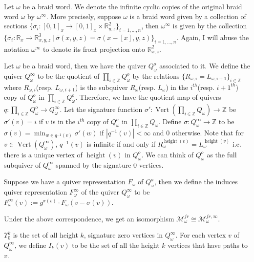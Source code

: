 \begin{definition}
	Let $\omega$ be a braid word. We denote the infinite cyclic copies of the original braid word $\omega$ by $\omega^\infty$. More precisely, suppose $\omega$ is a braid word given by a collection of sections $\{\sigma_i : [0,1]_x\rightarrow [0,1]_x\times \mathbb{R}^2_{y,z}\}_{i =1,\dots,n}$, then $\omega^\infty$ is given by the collection $\{\overline{\sigma_i} : \mathbb{R}_x\rightarrow \mathbb{R}^3_{x,y,z} ~|~ \overline{\sigma}(x,y,z) = \sigma(x-[x],y,z)\}_{i =1,\dots,n}$. Again, I will abuse the notation $\omega^\infty$ to denote its front projection onto $\mathbb{R}^2_{x,z}$. 
\end{definition}	
	
	
	
\begin{definition}	
	Let $\omega$ be a braid word, then we have the quiver $Q^o_\omega$ associated to it. We define the quiver $Q_\omega^\infty$ to be the quotient of  $\prod_{i \in \mathbb{Z}} Q^o_\omega$ by the relations $\{R_{\omega,i} = L_{\omega,i+1}\}_{i\in \mathbb{Z}}$ where $R_{\omega,i}$(resp. $L_{\omega,i+1}$) is the subquiver $R_{\omega}$(resp. $L_{\omega}$) in the $i^{th}$(resp. $i+1^{th}$) copy of $Q^o_\omega$ in $\prod_{i \in \mathbb{Z}} Q^o_\omega$. Therefore, we have the quotient map of quivers $q : \prod_{i \in \mathbb{Z}} Q^o_\omega \rightarrow Q_\omega^\infty$. Let the signature function $\sigma' : \operatorname{Vert}(\prod_{i \in \mathbb{Z}} Q_\omega) \rightarrow \mathbb{Z}$ be $\sigma'(v) = i$ if $v$ is in the $i^{th}$ copy of $Q^o_\omega$ in $\prod_{i \in \mathbb{Z}} Q_\omega$. Define $\sigma : Q_\omega^\infty \rightarrow \mathbb{Z}$ to be $\sigma(v) = \operatorname{min}_{w\in q^{-1}(v)} \sigma'(w)$ if $|q^{-1}(v)| < \infty$ and $0$ otherwise. Note that for $v\in \operatorname{Vert}(Q_\omega^\infty)$, $q^{-1}(v)$ is infinite if and only if $R_\omega^{\operatorname{height}(v)} = L_\omega^{\operatorname{height}(v)}$ i.e. there is a unique vertex of $\operatorname{height}(v)$ in $Q^o_\omega$. We can think of $Q^o_\omega$ as the full subquiver of $Q_\omega^\infty$ spanned by the signature $0$ vertices. 
\end{definition}

\begin{definition}	
Suppose we have a quiver representation $F_\omega$ of $Q^o_\omega$, then we define the induces quiver representation $F^{\infty}_{\omega}$ of the quiver $Q^{\infty}_{\omega}$ to be $F_\omega^\infty(v) := g^{\sigma(v)}\cdot F_\omega(v - \sigma(v))$. 
\end{definition}	
Under the above correspondence, we get an isomorphism $\mathcal{M}^{fr}_\omega \cong \mathcal{M}^{fr,\infty}_\omega$.
\begin{definition}
$\Upsilon^k_0$ is the set of all height $k$, signature zero vertices in $Q^{\infty}_{\omega}$. For each vertex $v$ of $Q^{\infty}_{\omega}$, we define $I_k(v)$ to be the set of all the height $k$ vertices that have paths to $v$.
\end{definition}

